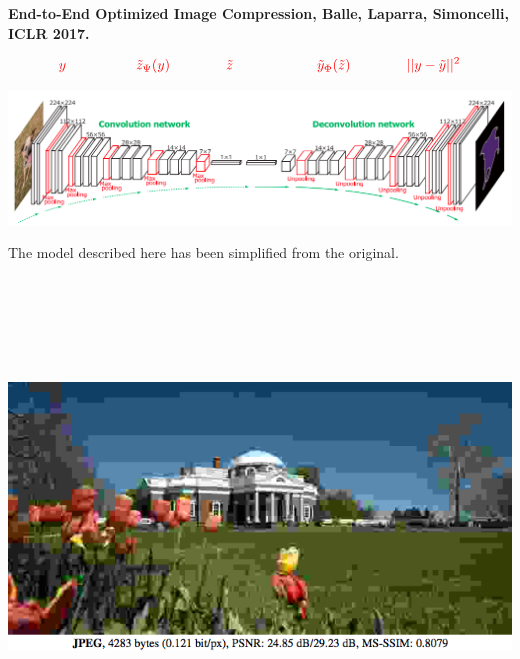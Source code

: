 {

{\bf End-to-End Optimized Image Compression, Balle, Laparra, Simoncelli, ICLR 2017.}


\vfill
$${\color{red}y \hspace{5em}  \tilde{z}_\Psi(y) \hspace{4em} \tilde{z} \hspace{6em} \tilde{y}_\Phi(\tilde{z}) \hspace{4em}||y - \tilde{y}||^2}$$
\centerline{\includegraphics[width=9in]{../images/Deconv}}

\vfill
The model described here has been simplified from the original.



\bigskip
\centerline{\includegraphics[height=5in]{../images/RateDist2}}


}
